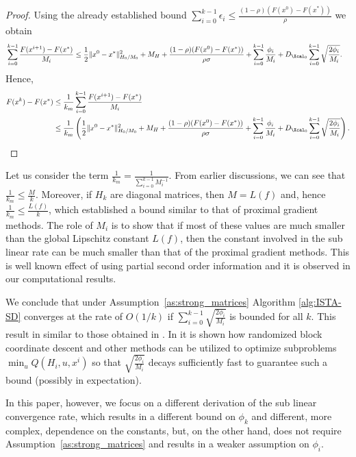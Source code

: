 \documentclass[11pt]{article}
\numberwithin{equation}{section}
\begin{document}
\begin{proof}
         Using the already established bound $\sum_{i=0}^{k-1}\epsilon_i \leq \frac{(1-\rho)(F(x^0)-F(x^*))}{\rho}$ we obtain
          \begin{align*}
         &\sum_{i=0}^{k-1} \frac{F(x^{i+1}) - F(x^*)}{M_i}\leq
         \frac{1}{2} \|x^0-x^*\|_{H_0/M_0}^2 +M_H
         + \frac{(1-\rho)(F(x^0)-F(x^*))}{\rho\sigma} 
         + \sum_{i=0}^{k-1}\frac{\phi_i}{M_i}
         + D_{\Xcal_0}\sum_{i=0}^{k-1} \sqrt{\frac{2\phi_i}{M_i}}.
     \end{align*}
     Hence,
     \begin{align*}
         F(x^k) - F(x^*) &\leq \frac{1}{k_m}\sum_{i=0}^{k-1} \frac{F(x^{i+1}) - F(x^*)}{M_i}\\        
         &\leq \frac{1}{k_m} \left( \frac{1}{2} \|x^0-x^*\|_{H_0/M_0}^2 +M_H
         + \frac{(1-\rho)(F(x^0)-F(x^*))}{\rho\sigma} 
         + \sum_{i=0}^{k-1}\frac{\phi_i}{M_i}
         + D_{\Xcal_0}\sum_{i=0}^{k-1} \sqrt{\frac{2\phi_i}{M_i}} \right).
     \end{align*}
 \end{proof}

 



Let us consider the term $\frac{1}{k_m}=\frac{1}{\sum_{i=0}^{k-1}M_i^{-1}}$. From earlier discussions, we can see that 
$\frac{1}{k_m}\leq\frac{M}{k}$. Moreover, if $H_k$ are diagonal matrices, then $M=L(f)$ and, hence $\frac{1}{k_m}\leq\frac{L(f)}{k}$,
which established a bound similar to that of proximal gradient methods. The role of $M_i$ is to show that if most of these values are much smaller than the global Lipschitz constant $L(f)$, then the constant involved in the sub linear rate can be much smaller than that of the proximal gradient methods.
This is  well known effect of using partial second order information and it is observed in our computational results. 

We conclude that under Assumption~\ref{as:strong_matrices} Algorithm \ref{alg:ISTA-SD} converges at the rate of $O(1/k)$ if 
$\sum_{i=0}^{k-1} \sqrt{\frac{2\phi_i}{M_i}}$ is bounded for all $k$. This result in similar to those obtained in \cite{Schmidtetal}.
In \cite{OML} it is shown how randomized block coordinate descent and other methods can be utilized to optimize subproblems 
$\min_u Q(H_i,u, x^i)$
so that  $\sqrt{\frac{2\phi_i}{M_i}}$ decays sufficiently fast to guarantee  such a bound (possibly in expectation).

In this paper, however, we focus on a different derivation of the sub linear convergence rate, which results in a different bound on $\phi_k$
and different, more complex, dependence on the constants, but, on the other hand, does not require Assumption~\ref{as:strong_matrices}
and results in a weaker assumption on $\phi_i$. 
\end{document}
